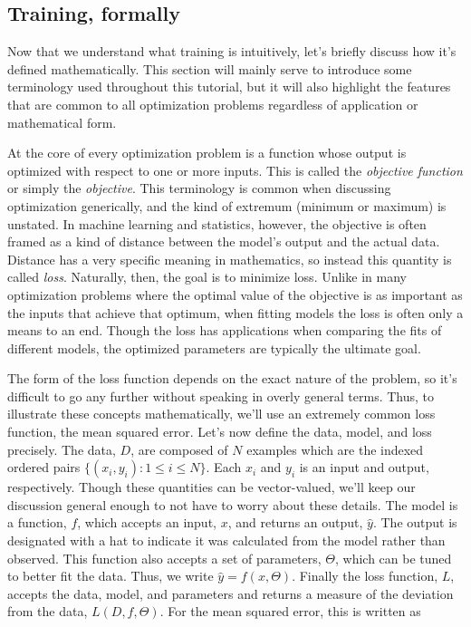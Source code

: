 \subsection{Training, formally}

Now that we understand what training is intuitively, let's briefly discuss how it's defined mathematically. This section will mainly serve to introduce some terminology used throughout this tutorial, but it will also highlight the features that are common to all optimization problems regardless of application or mathematical form.

At the core of every optimization problem is a function whose output is optimized with respect to one or more inputs. This is called the \textit{objective function} or simply the \textit{objective}. This terminology is common when discussing optimization generically, and the kind of extremum (minimum or maximum) is unstated. In machine learning and statistics, however, the objective is often framed as a kind of distance between the model's output and the actual data. Distance has a very specific meaning in mathematics, so instead this quantity is called \textit{loss}. Naturally, then, the goal is to minimize loss. Unlike in many optimization problems where the optimal value of the objective is as important as the inputs that achieve that optimum, when fitting models the loss is often only a means to an end. Though the loss has applications when comparing the fits of different models, the optimized parameters are typically the ultimate goal.

The form of the loss function depends on the exact nature of the problem, so it's difficult to go any further without speaking in overly general terms. Thus, to illustrate these concepts mathematically, we'll use an extremely common loss function, the mean squared error. Let's now define the data, model, and loss precisely. The data, $D$, are composed of $N$ examples which are the indexed ordered pairs $\{(x_i, y_i):1 \le i \le N\}$. Each $x_i$ and $y_i$ is an input and output, respectively. Though these quantities can be vector-valued, we'll keep our discussion general enough to not have to worry about these details. The model is a function, $f$, which accepts an input, $x$, and returns an output, $\hat{y}$. The output is designated with a hat to indicate it was calculated from the model rather than observed. This function also accepts a set of parameters, $\Theta$, which can be tuned to better fit the data. Thus, we write $\hat{y} = f(x, \Theta)$. Finally the loss function, $L$, accepts the data, model, and parameters and returns a measure of the deviation from the data, $L(D, f, \Theta)$. For the mean squared error, this is written as


